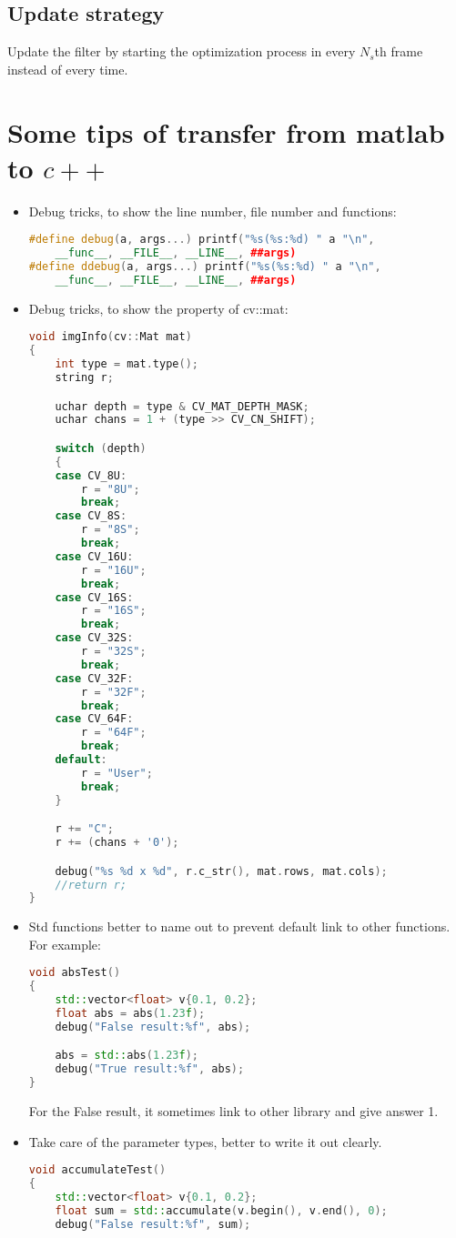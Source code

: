 \documentclass[12pt]{article}
\numberwithin{equation}{section}
\begin{document}
{\subsection{Update strategy}
Update the filter by starting the optimization process in every $N_s$th frame instead of every time.
\section{Some tips of transfer from matlab to $c++$}
\begin{itemize}
	\item Debug tricks, to show the line number, file number and functions:
		\begin{lstlisting}[language=C++]
#define debug(a, args...) printf("%s(%s:%d) " a "\n", 
	__func__, __FILE__, __LINE__, ##args)
#define ddebug(a, args...) printf("%s(%s:%d) " a "\n", 
	__func__, __FILE__, __LINE__, ##args)
		\end{lstlisting}
	\item Debug tricks, to show the property of cv::mat:
		\begin{lstlisting}[language=C++]
void imgInfo(cv::Mat mat)
{
	int type = mat.type();
	string r;

	uchar depth = type & CV_MAT_DEPTH_MASK;
	uchar chans = 1 + (type >> CV_CN_SHIFT);

	switch (depth)
	{
	case CV_8U:
		r = "8U";
		break;
	case CV_8S:
		r = "8S";
		break;
	case CV_16U:
		r = "16U";
		break;
	case CV_16S:
		r = "16S";
		break;
	case CV_32S:
		r = "32S";
		break;
	case CV_32F:
		r = "32F";
		break;
	case CV_64F:
		r = "64F";
		break;
	default:
		r = "User";
		break;
	}

	r += "C";
	r += (chans + '0');

	debug("%s %d x %d", r.c_str(), mat.rows, mat.cols);
	//return r;
}
		\end{lstlisting}		
	\item Std functions better to name out to prevent default link to other functions. 
	For example: 
		\begin{lstlisting}[language=C++]
void absTest()
{
	std::vector<float> v{0.1, 0.2};
	float abs = abs(1.23f);
	debug("False result:%f", abs);

	abs = std::abs(1.23f);
	debug("True result:%f", abs);
}
		\end{lstlisting}
	For the False result, it sometimes link to other library and give answer 1.
	\item Take care of the parameter types, better to write it out clearly.
		\begin{lstlisting}[language=C++]
void accumulateTest()
{
	std::vector<float> v{0.1, 0.2};
	float sum = std::accumulate(v.begin(), v.end(), 0);
	debug("False result:%f", sum);


\end{lstlisting}
\end{itemize}}
\end{document}
